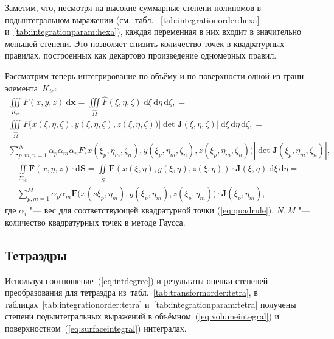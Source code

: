 Заметим, что, несмотря на высокие суммарные степени полиномов в подынтегральном выражении (см.~табл.~ \ref{tab:integrationorder:hexa} и~\ref{tab:integrationparam:hexa}), каждая переменная в них входит в значительно меньшей степени. Это позволяет снизить количество точек в квадратурных правилах, построенных как декартово произведение одномерных правил.


Рассмотрим теперь интегрирование по объёму и по поверхности одной из грани элемента~\(K_{ie}\):
{
\newcommand*{\vecxi}{\xi, \eta, \zeta}
\newcommand*{\vecxiind}[3]{\xi_#1, \eta_#2, \zeta_#3}
\begin{multline*}
	\iiint\limits_{K_{ie}}F(x, y, z)\: \mathrm d\mathbf x = \iiint\limits_{\hat\Omega}\hat F(\vecxi)\:\mathrm d\xi\,\mathrm d\eta\, \mathrm d\zeta, = \\
	\iiint\limits_{\hat\Omega}F\big(x(\vecxi), y(\vecxi), z(\vecxi)\big) \left|\det\mathbf J(\vecxi)\right|\:\mathrm d\xi\,\mathrm d\eta\, \mathrm d\zeta, = \\
	\sum_{p, m, n = 1}^N \alpha_p\alpha_m\alpha_n F\big(x(\vecxiind{p}{m}{n}), y(\vecxiind{p}{m}{n}), z(\vecxiind{p}{m}{n})\big) \left|\det\mathbf J(\vecxiind{p}{m}{n})\right|,
\end{multline*}
}
\begin{multline*}
\iint\limits_{\Sigma_{ie}}\mathbf F(x, y, z)\cdot \mathrm d\mathbf{S} =
\iint\limits_{\hat{S}}\mathbf F(x(\xi, \eta), y(\xi, \eta), z(\xi, \eta))\cdot \mathbf J(\xi, \eta)\: \mathrm d\xi\, \mathrm d\eta = \\
\sum_{p, m = 1}^M \alpha_p\alpha_m \mathbf F\big(x(s\xi_p, \eta_m), y(\xi_p, \eta_m), z(\xi_p, \eta_m)\big) \cdot \mathbf J(\xi_p, \eta_m),
\end{multline*}
где \(\alpha_i\) "--- вес для соответствующей квадратурной точки (\ref{eq:quadrule}), \(N, M\) "--- количество квадратурных точек в методе Гаусса.



\subsection{Тетраэдры} \label{subsect:tetrarules}

Используя соотношение~(\ref{eq:intdegree}) и результаты оценки степеней преобразования для тетраэдра из~табл.~\ref{tab:transformorder:tetra}, в таблицах~\ref{tab:integrationorder:tetra} и~\ref{tab:integrationparam:tetra} получены степени подынтегральных выражений в объёмном~(\ref{eq:volumeintegral}) и поверхностном~(\ref{eq:surfaceintegral}) интегралах.

